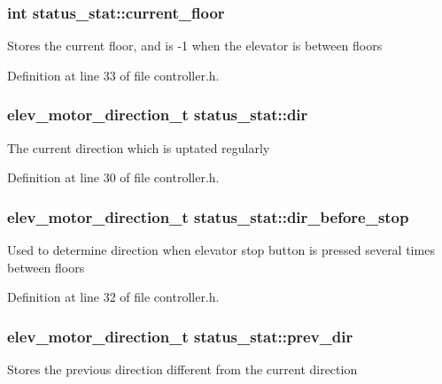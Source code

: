 \subsubsection[{\texorpdfstring{current\+\_\+floor}{current_floor}}]{\setlength{\rightskip}{0pt plus 5cm}int status\+\_\+stat\+::current\+\_\+floor}\hypertarget{structstatus__stat_afb8f4c42e97ba9ede62ba17a2f157757}{}\label{structstatus__stat_afb8f4c42e97ba9ede62ba17a2f157757}
Stores the current floor, and is -\/1 when the elevator is between floors 

Definition at line 33 of file controller.\+h.

\subsubsection[{\texorpdfstring{dir}{dir}}]{\setlength{\rightskip}{0pt plus 5cm}elev\+\_\+motor\+\_\+direction\+\_\+t status\+\_\+stat\+::dir}\hypertarget{structstatus__stat_a86473b5ad6efc13580fd36cd74490f8f}{}\label{structstatus__stat_a86473b5ad6efc13580fd36cd74490f8f}
The current direction which is uptated regularly 

Definition at line 30 of file controller.\+h.

\subsubsection[{\texorpdfstring{dir\+\_\+before\+\_\+stop}{dir_before_stop}}]{\setlength{\rightskip}{0pt plus 5cm}elev\+\_\+motor\+\_\+direction\+\_\+t status\+\_\+stat\+::dir\+\_\+before\+\_\+stop}\hypertarget{structstatus__stat_a9edb07751cab0af2679e323190e49762}{}\label{structstatus__stat_a9edb07751cab0af2679e323190e49762}
Used to determine direction when elevator stop button is pressed several times between floors 

Definition at line 32 of file controller.\+h.

\subsubsection[{\texorpdfstring{prev\+\_\+dir}{prev_dir}}]{\setlength{\rightskip}{0pt plus 5cm}elev\+\_\+motor\+\_\+direction\+\_\+t status\+\_\+stat\+::prev\+\_\+dir}\hypertarget{structstatus__stat_a57dbf007f4cf7b8d0b2872a99f5e6f62}{}\label{structstatus__stat_a57dbf007f4cf7b8d0b2872a99f5e6f62}
Stores the previous direction different from the current direction 

